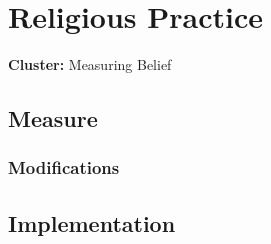 \documentclass[
  letterpaper,
]{scrbook}
\begin{document}
\chapter{Religious Practice}\label{religious-practice}

\textbf{Cluster:} Measuring Belief

\section{Measure}\label{measure-20}

\subsection*{Modifications}\label{modifications-17}

\section{Implementation}\label{implementation-20}
\end{document}
